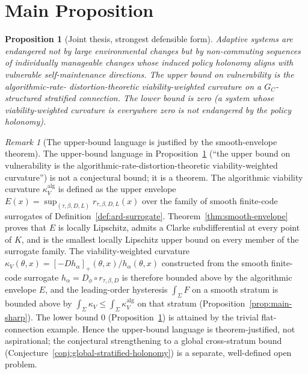 \documentclass[11pt,a4paper]{article}
\theoremstyle{plain}
\newtheorem{proposition}[theorem]{Proposition}
\theoremstyle{definition}
\theoremstyle{remark}
\newtheorem{remark}[theorem]{Remark}
\begin{document}
\section{Main Proposition}\label{sec:mainprop}

\begin{proposition}[Joint thesis, strongest defensible form]
\label{prop:main}
Adaptive systems are endangered not by large environmental changes but
by non-commuting sequences of individually manageable changes whose
induced policy holonomy aligns with vulnerable self-maintenance
directions. The upper bound on vulnerability is the algorithmic-rate-
distortion-theoretic viability-weighted curvature on a
$G_C$-structured stratified connection. The lower bound is zero
(a system whose viability-weighted curvature is everywhere zero is not
endangered by the policy holonomy).
\end{proposition}

\begin{remark}[The upper-bound language is justified by the
smooth-envelope theorem]
\label{rem:main-bound}
The upper-bound language in Proposition~\ref{prop:main} (``the upper
bound on vulnerability is the algorithmic-rate-distortion-theoretic
viability-weighted curvature'') is not a conjectural bound; it is a
theorem. The algorithmic viability curvature
$\kappa_V^{\mathrm{alg}}$ is defined as the upper envelope
$E(x) = \sup_{(\tau, \beta, D, L)} r_{\tau, \beta, D, L}(x)$ over the
family of smooth finite-code surrogates of
Definition~\ref{def:ard-surrogate}. Theorem~\ref{thm:smooth-envelope}
proves that $E$ is locally Lipschitz, admits a Clarke subdifferential
at every point of $K$, and is the smallest locally Lipschitz upper
bound on every member of the surrogate family. The
viability-weighted curvature
$\kappa_V(\theta, x) = [-D h_\alpha]_+(\theta, x) / h_\alpha(\theta, x)$
constructed from the smooth finite-code surrogate
$h_\alpha = D_\phi \circ r_{\tau, \beta, D}$ is therefore bounded
above by the algorithmic envelope $E$, and the leading-order
hysteresis $\int_\Sigma F$ on a smooth stratum is bounded above by
$\int_\Sigma \kappa_V \le \int_\Sigma \kappa_V^{\mathrm{alg}}$ on that
stratum (Proposition~\ref{prop:main-sharp}). The lower bound
$0$ (Proposition~\ref{prop:main}) is attained by the trivial
flat-connection example. Hence the upper-bound language is
theorem-justified, not aspirational; the conjectural strengthening to
a global cross-stratum bound (Conjecture~\ref{conj:global-stratified-holonomy})
is a separate, well-defined open problem.
\end{remark}
\end{document}
